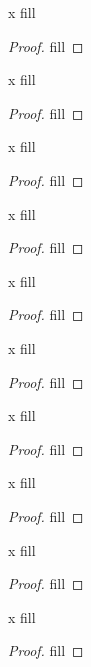 \begin{exercise}{x}
fill
\end{exercise}
\begin{proof}
fill
\end{proof} 

\begin{exercise}{x}
fill
\end{exercise}
\begin{proof}
fill
\end{proof} 

\begin{exercise}{x}
fill
\end{exercise}
\begin{proof}
fill
\end{proof} 

\begin{exercise}{x}
fill
\end{exercise}
\begin{proof}
fill
\end{proof} 

\begin{exercise}{x}
fill
\end{exercise}
\begin{proof}
fill
\end{proof} 

\begin{exercise}{x}
fill
\end{exercise}
\begin{proof}
fill
\end{proof} 

\begin{exercise}{x}
fill
\end{exercise}
\begin{proof}
fill
\end{proof} 

\begin{exercise}{x}
fill
\end{exercise}
\begin{proof}
fill
\end{proof} 

\begin{exercise}{x}
fill
\end{exercise}
\begin{proof}
fill
\end{proof} 

\begin{exercise}{x}
fill
\end{exercise}
\begin{proof}
fill
\end{proof} 